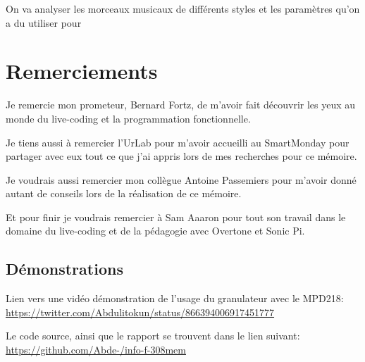 \documentclass[letterpaper]{article}
\begin{document}
On va analyser les morceaux musicaux de différents styles et les paramètres qu'on a du utiliser
pour 


\section{Remerciements}
  Je remercie mon prometeur, Bernard Fortz, de m'avoir fait découvrir
  les yeux au monde du live-coding et la programmation fonctionnelle.

  Je tiens aussi à remercier l'UrLab pour m'avoir accueilli au SmartMonday
  pour partager avec eux tout ce que j'ai appris lors de mes recherches
  pour ce mémoire.

  Je voudrais aussi remercier mon collègue Antoine Passemiers pour m'avoir donné autant de conseils
  lors de la réalisation de ce mémoire.

  Et pour finir je voudrais remercier à Sam Aaaron pour tout son travail dans le domaine du live-coding
  et de la pédagogie avec Overtone et Sonic Pi.

\footnotesize





\begin{appendices}
  \section{Démonstrations}
  Lien vers une vidéo démonstration de l'usage du granulateur avec le MPD218: 
  \url{https://twitter.com/Abdulitokun/status/866394006917451777}

  Le code source, ainsi que le rapport se trouvent dans le lien suivant:
  \url{https://github.com/Abde-/info-f-308mem}

  
\end{appendices}
\end{document}
